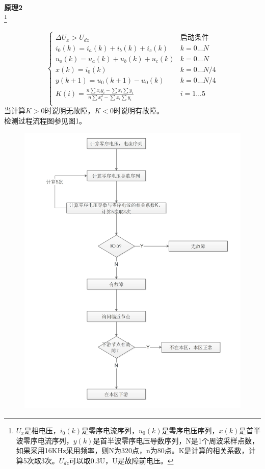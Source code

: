 \documentclass{article}
\begin{document}
\begin{CJK}{UTF8}{gbsn}
\begin{enumerate}
	\textbf{原理2}\\
	\footnote{$U_x$是相电压，$i_0(k)$是零序电流序列，$u_0(k)$是零序电压序列，$x(k)$是首半波零序电流序列，$y(k)$是首半波零序电压导数序列，N是1个周波采样点数，如果采用16KHz采用频率，则N为320点，n为80点。K是计算的相关系数，计算5次取3次。$U_{dz}$可以取0.3U，U是故障前电压。}
	\par
		$$
			\left\{	
				\begin{array}{ll}
				\Delta U_x>U_{dz} & \textrm{启动条件}\\
				i_0(k)=i_a(k) + i_b(k) + i_c(k) & k=0...N \\
				u_o(k)=u_a(k)+u_b(k)+u_c(k) & k=0...N \\
				x(k)=i_0(k) & k=0...N/4 \\
				y(k+1)=u_0(k+1)-u_0(k) & k=0...N/4 \\
				K(i)=\frac{n\sum{x_i y_i}-\sum x_i\sum y_i}{n\sum x_i^2 - \sum x_i \sum y_i} & i=1...5\\
				\end{array}
			\right.
		$$
		当计算$K>0$时说明无故障，$K<0$时说明有故障。\\
		检测过程流程图参见图1。\\
		\begin{figure}[H]
		\centering
		\includegraphics[scale=0.4]{figure1.jpg}

\end{figure}
\end{enumerate}
\end{CJK}
\end{document}
